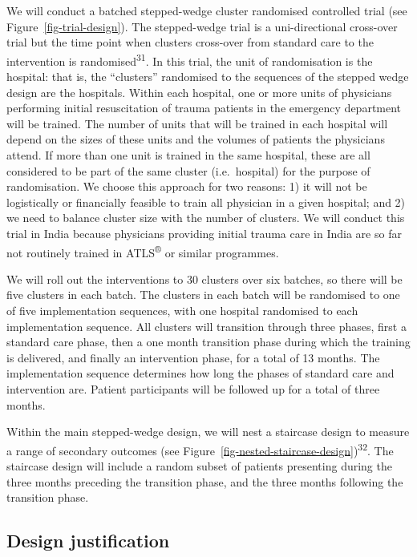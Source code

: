 \documentclass[
]{scrartcl}
\begin{document}
We will conduct a batched stepped-wedge cluster randomised controlled
trial (see Figure~\ref{fig-trial-design}). The stepped-wedge trial is a
uni-directional cross-over trial but the time point when clusters
cross-over from standard care to the intervention is
randomised\textsuperscript{31}. In this trial, the unit of randomisation
is the hospital: that is, the ``clusters'' randomised to the sequences
of the stepped wedge design are the hospitals. Within each hospital, one
or more units of physicians performing initial resuscitation of trauma
patients in the emergency department will be trained. The number of
units that will be trained in each hospital will depend on the sizes of
these units and the volumes of patients the physicians attend. If more
than one unit is trained in the same hospital, these are all considered
to be part of the same cluster (i.e.~hospital) for the purpose of
randomisation. We choose this approach for two reasons: 1) it will not
be logistically or financially feasible to train all physician in a
given hospital; and 2) we need to balance cluster size with the number
of clusters. We will conduct this trial in India because physicians
providing initial trauma care in India are so far not routinely trained
in ATLS\textsuperscript{®} or similar programmes.

We will roll out the interventions to 30 clusters over six batches, so
there will be five clusters in each batch. The clusters in each batch
will be randomised to one of five implementation sequences, with one
hospital randomised to each implementation sequence. All clusters will
transition through three phases, first a standard care phase, then a one
month transition phase during which the training is delivered, and
finally an intervention phase, for a total of 13 months. The
implementation sequence determines how long the phases of standard care
and intervention are. Patient participants will be followed up for a
total of three months.

Within the main stepped-wedge design, we will nest a staircase design to
measure a range of secondary outcomes (see
Figure~\ref{fig-nested-staircase-design})\textsuperscript{32}. The
staircase design will include a random subset of patients presenting
during the three months preceding the transition phase, and the three
months following the transition phase.

\hypertarget{design-justification}{%
\subsection{Design justification}\label{design-justification}}
\end{document}
